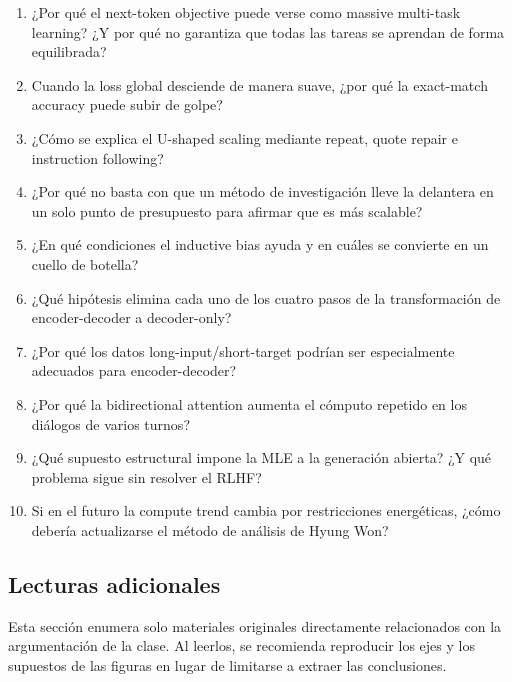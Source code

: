 \begin{enumerate}
  \item ¿Por qué el next-token objective puede verse como massive multi-task learning? ¿Y por qué no garantiza que todas las tareas se aprendan de forma equilibrada?
  \item Cuando la loss global desciende de manera suave, ¿por qué la exact-match accuracy puede subir de golpe?
  \item ¿Cómo se explica el U-shaped scaling mediante repeat, quote repair e instruction following?
  \item ¿Por qué no basta con que un método de investigación lleve la delantera en un solo punto de presupuesto para afirmar que es más scalable?
  \item ¿En qué condiciones el inductive bias ayuda y en cuáles se convierte en un cuello de botella?
  \item ¿Qué hipótesis elimina cada uno de los cuatro pasos de la transformación de encoder-decoder a decoder-only?
  \item ¿Por qué los datos long-input/short-target podrían ser especialmente adecuados para encoder-decoder?
  \item ¿Por qué la bidirectional attention aumenta el cómputo repetido en los diálogos de varios turnos?
  \item ¿Qué supuesto estructural impone la MLE a la generación abierta? ¿Y qué problema sigue sin resolver el RLHF?
  \item Si en el futuro la compute trend cambia por restricciones energéticas, ¿cómo debería actualizarse el método de análisis de Hyung Won?
\end{enumerate}

\subsection{Lecturas adicionales}

Esta sección enumera solo materiales originales directamente relacionados con la argumentación de la clase. Al leerlos, se recomienda reproducir los ejes y los supuestos de las figuras en lugar de limitarse a extraer las conclusiones.

